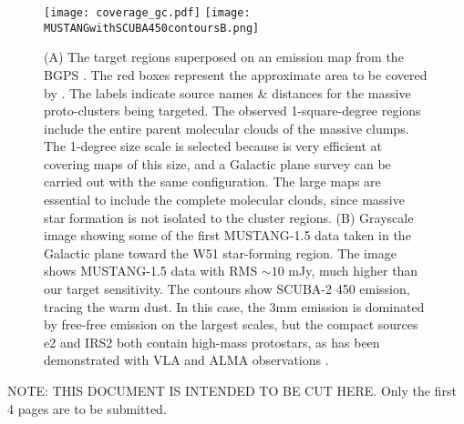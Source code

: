 \begin{figure}
\texttt{[image: coverage\_gc.pdf]}
\texttt{[image: MUSTANGwithSCUBA450contoursB.png]}
\caption{(A) The target regions superposed on an emission map from the BGPS
\citep{Aguirre2011a,Ginsburg2013a}.  The red boxes represent the approximate
area to be covered by \MUSTANG.  The labels indicate source names \& distances
for the massive proto-clusters being targeted.  The observed 1-square-degree
regions include the entire parent molecular clouds of the massive clumps.  The
1-degree size scale is selected because \MUSTANG is very efficient at
covering maps of this size, and a Galactic plane survey can be carried out with
the same configuration.  The large maps are essential to include the complete
molecular clouds, since massive star formation is not isolated to the cluster
regions. \hspace{\textwidth}
(B) Grayscale image showing some of the first MUSTANG-1.5 data taken in the
Galactic plane toward the W51 star-forming region.  The image shows MUSTANG-1.5
data with RMS $\sim10$ mJy, much higher than our target sensitivity.  The
contours show SCUBA-2 450 \um emission, tracing the warm dust.  In this case,
the 3mm emission is dominated by free-free emission on the largest scales, but
the compact sources e2 and IRS2 both contain high-mass protostars, as has
been demonstrated with VLA and ALMA observations \citep{Ginsburg2016b}.
}
\label{fig:figure}
\end{figure}

\clearpage

NOTE: THIS DOCUMENT IS INTENDED TO BE CUT HERE.  Only the first 4 pages are to be submitted.


% 
% 
% 


